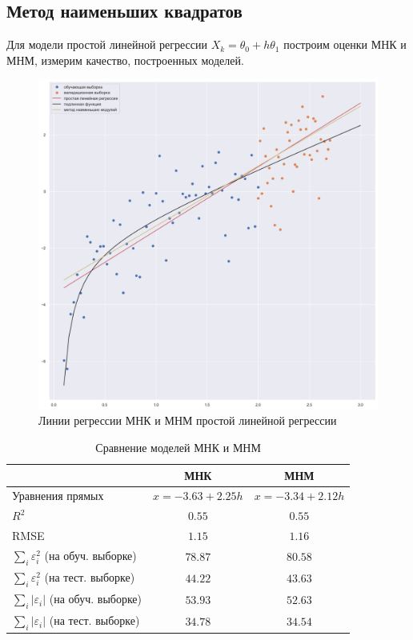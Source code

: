 \documentclass[a4paper,12pt]{article}
\begin{document}
\subsection{Метод наименьших квадратов}

Для модели простой линейной регрессии $X_k = \theta_0 + h\theta_1$ построим оценки МНК и МНМ, измерим качество, построенных моделей.

\begin{figure}[H]
    \centering
    \includegraphics[width=0.9\linewidth]{src/img/простая_линейная регрессия.png}
    \caption{Линии регрессии МНК и МНМ простой линейной регрессии}
\end{figure}

\begin{table}[H]
    \centering
    \begin{tabular}{|l|c|c|}
        \hline
        & МНК & МНМ \\ \hline
        Уравнения прямых & $x = -3.63 + 2.25 h$ & $x = -3.34 + 2.12 h$ \\ \hline
        $R^2$ & $0.55$ & $0.55$ \\ \hline
        RMSE & $1.15$ & $1.16$ \\ \hline
        $\sum\limits_i \varepsilon_i^2$ (на обуч. выборке) & $78.87$ & $80.58$ \\ \hline
        $\sum\limits_i \varepsilon_i^2$ (на тест. выборке) & $44.22$ & $43.63$ \\ \hline
        $\sum\limits_i |\varepsilon_i|$ (на обуч. выборке) & $53.93$ & $52.63$ \\ \hline
        $\sum\limits_i |\varepsilon_i|$ (на тест. выборке) & $34.78$ & $34.54$ \\ \hline
    \end{tabular}
    \caption{Сравнение моделей МНК и МНМ}
\end{table}
\end{document}
